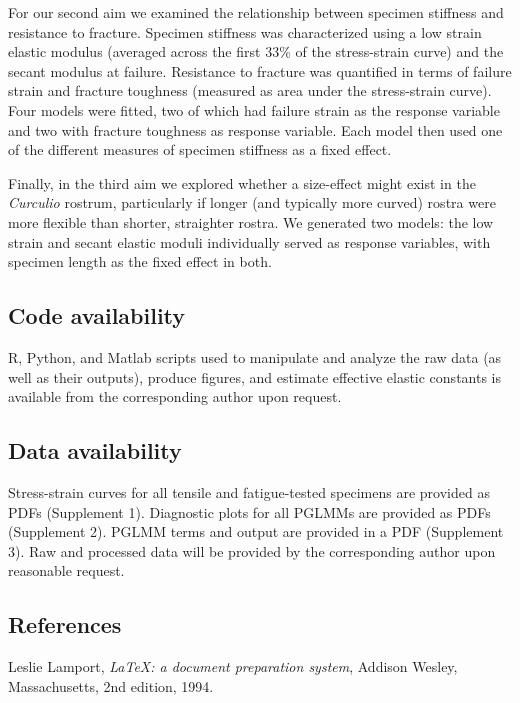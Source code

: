 \documentclass[twocolumn, linenumbers, superscriptaddress, nofootinbib]{revtex4-1}
\begin{document}
				For our second aim we examined the relationship between specimen stiffness and resistance to fracture.
				Specimen stiffness was characterized using a low strain elastic modulus (averaged across the first 33\% of the stress-strain curve) and the secant modulus at failure.
				Resistance to fracture was quantified in terms of failure strain and fracture toughness (measured as area under the stress-strain curve).
				Four models were fitted, two of which had failure strain as the response variable and two with fracture toughness as response variable.
				Each model then used one of the different measures of specimen stiffness as a fixed effect.
				
				Finally, in the third aim we explored whether a size-effect might exist in the \textit{Curculio} rostrum, particularly if longer (and typically more curved) rostra were more flexible than shorter, straighter rostra.
				We generated two models: the low strain and secant elastic moduli individually served as response variables, with specimen length as the fixed effect in both.

		\subsection*{Code availability}
			R, Python, and Matlab scripts used to manipulate and analyze the raw data (as well as their outputs), produce figures, and estimate effective elastic constants is available from the corresponding author upon request.
			
		\subsection*{Data availability}
			Stress-strain curves for all tensile and fatigue-tested specimens are provided as PDFs (Supplement 1).
			Diagnostic plots for all PGLMMs are provided as PDFs (Supplement 2). PGLMM terms and output are provided in a PDF (Supplement 3). Raw and processed data will be provided by the corresponding author upon reasonable request.

	\begin{thebibliography}{50}
		\section*{References}	
				Leslie Lamport,
				\textit{\LaTeX: a document preparation system},
				Addison Wesley, Massachusetts,
				2nd edition,
				1994.

	\end{thebibliography}
\end{document}
